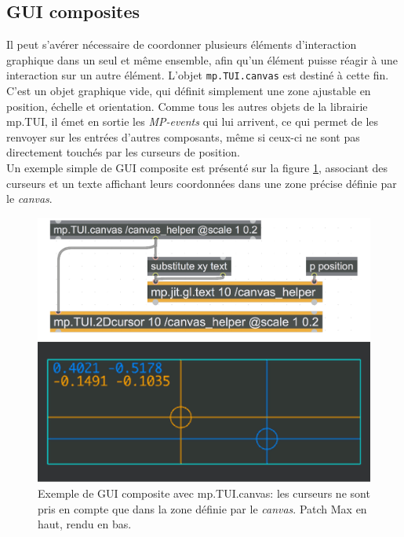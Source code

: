\subsection{GUI composites}

\noindent Il peut s'avérer nécessaire de coordonner plusieurs éléments d'interaction graphique dans un seul et même ensemble, afin qu'un élément puisse réagir à une interaction sur un autre élément. L'objet \verb|mp.TUI.canvas| est destiné à cette fin. C'est un objet graphique vide, qui définit simplement une zone ajustable en position, échelle et orientation. Comme tous les autres objets de la librairie mp.TUI, il émet en sortie les \textit{MP-events} qui lui arrivent, ce qui permet de les renvoyer sur les entrées d'autres composants, même si ceux-ci ne sont pas directement touchés par les curseurs de position.\\
\indent Un exemple simple de \gls{GUI} composite est présenté sur la figure \ref{fig:visual_representation:canvas}, associant des curseurs et un texte affichant leurs coordonnées dans une zone précise définie par le \textit{canvas}.


\begin{figure}[!htbp]
	\captionsetup{format=plain}%
	\includegraphics[width=\textwidth]{gfx/06_visual_representation/mpTUI_canvas.pdf}
	\caption[Exemple de GUI composite avec mp.TUI.canvas]{Exemple de GUI composite avec mp.TUI.canvas: les curseurs ne sont pris en compte que dans la zone définie par le \textit{canvas}. Patch Max en haut, rendu en bas.}
	\label{fig:visual_representation:canvas}
\end{figure}

